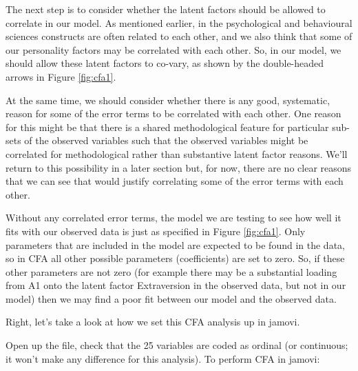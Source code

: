 The next step is to consider whether the latent factors should be allowed to correlate in our model. As mentioned earlier, in the psychological and behavioural sciences constructs are often related to each other, and we also think that some of our personality factors may be correlated with each other. So, in our model, we should allow these latent factors to co-vary, as shown by the double-headed arrows in Figure \ref{fig:cfa1}. 

At the same time, we should consider whether there is any good, systematic, reason for some of the error terms to be correlated with each other. One reason for this might be that there is a shared methodological feature for particular sub-sets of the observed variables such that the observed variables might be correlated for methodological rather than substantive latent factor reasons. We’ll return to this possibility in a later section but, for now, there are no clear reasons that we can see that would justify correlating some of the error terms with each other.

Without any correlated error terms, the model we are testing to see how well it fits with our observed data is just as specified in Figure \ref{fig:cfa1}. Only parameters that are included in the model are expected to be found in the data, so in CFA all other possible parameters (coefficients) are set to zero. So, if these other parameters are not zero (for example there may be a substantial loading from A1 onto the latent factor Extraversion in the observed data, but not in our model) then we may find a poor fit between our model and the observed data. 

Right, let’s take a look at how we set this CFA analysis up in jamovi.


Open up the  file, check that the 25 variables are coded as ordinal (or continuous; it won’t make any difference for this analysis). To perform CFA in jamovi:

